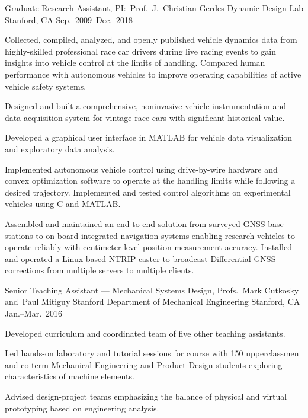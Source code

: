 \begin{cventries}
  \cventry%
    {Graduate Research Assistant, PI:\ Prof.~J.~Christian Gerdes}
    {Dynamic Design Lab}
    {Stanford, CA}
    {Sep.\ 2009--Dec.\ 2018}
    {%
      \begin{cvitems}
        \item{Collected, compiled, analyzed, and openly published vehicle dynamics data from highly-skilled professional race car drivers during live racing events to gain insights into vehicle control at the limits of handling. Compared human performance with autonomous vehicles to improve operating capabilities of active vehicle safety systems.}
        \item{Designed and built a comprehensive, noninvasive vehicle instrumentation and data acquisition system for vintage race cars with significant historical value.}
        \item{Developed a graphical user interface in MATLAB for vehicle data visualization and exploratory data analysis.}
        \item{Implemented autonomous vehicle control using drive-by-wire hardware and convex optimization software to operate at the handling limits while following a desired trajectory. Implemented and tested control algorithms on experimental vehicles using C and MATLAB.}
        \item{Assembled and maintained an end-to-end solution from surveyed GNSS base stations to on-board integrated navigation systems enabling research vehicles to operate reliably with centimeter-level position measurement accuracy. Installed and operated a Linux-based NTRIP caster to broadcast Differential GNSS corrections from multiple servers to multiple clients.}
      \end{cvitems}
    }

  \cventry%
    {Senior Teaching Assistant --- Mechanical Systems Design, Profs.~Mark Cutkosky and~Paul Mitiguy}
    {Stanford Department of Mechanical Engineering}
    {Stanford, CA}
    {Jan.--Mar.\ 2016}
    {%
      \begin{cvitems}
        \item{Developed curriculum and coordinated team of five other teaching assistants.}
        \item{Led hands-on laboratory and tutorial sessions for course with 150 upperclassmen and co-term Mechanical Engineering and Product Design students exploring characteristics of machine elements.}
        \item{Advised design-project teams emphasizing the balance of physical and virtual prototyping based on engineering analysis.}
      \end{cvitems}
    }
\end{cventries}
